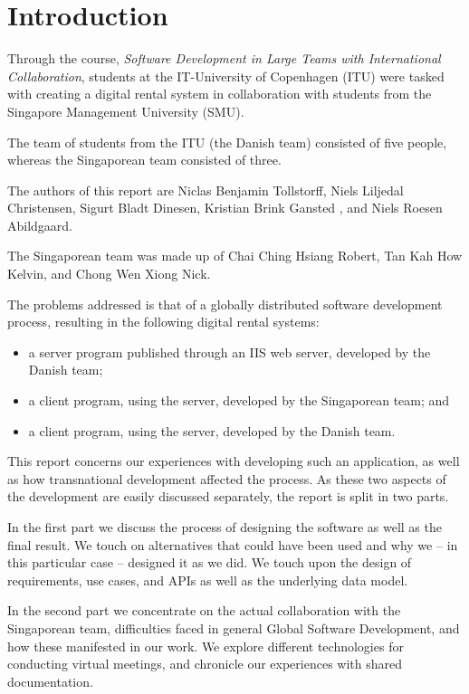 \section{Introduction}
Through the course, \emph{Software Development in Large Teams with
International Collaboration}, students at the IT-University of Copenhagen (ITU)
were tasked with creating a digital rental system in collaboration with
students from the Singapore Management University (SMU).

The team of students from the ITU (the Danish team) consisted of five people,
whereas the Singaporean team consisted of three.

The authors of this report are Niclas Benjamin Tollstorff, Niels Liljedal
Christensen, Sigurt Bladt Dinesen, Kristian Brink Gansted , and Niels Roesen
Abildgaard.

The Singaporean team was made up of Chai Ching Hsiang Robert, Tan Kah How Kelvin, and
Chong Wen Xiong Nick.

The problems addressed is that of a globally distributed software development
process, resulting in the following digital rental systems:
\begin{itemize}
    \item a server program published through an IIS web server, developed by the Danish team;
    \item a client program, using the server, developed by the Singaporean team; and
    \item a client program, using the server, developed by the Danish team.
\end{itemize}

This report concerns our experiences with developing such an application, as well as how
transnational development affected the process. As these two aspects of the development
are easily discussed separately, the report is split in two parts.

In the first part we discuss the process of designing the software as well as the final
result. We touch on alternatives that could have been used and why we – in this particular
case – designed it as we did. We touch upon the design of requirements, use cases, and APIs
as well as the underlying data model.

In the second part we concentrate on the actual collaboration with the Singaporean team,
difficulties faced in general Global Software Development, and how these manifested in
our work. We explore different technologies for conducting virtual meetings, and chronicle
our experiences with shared documentation.
